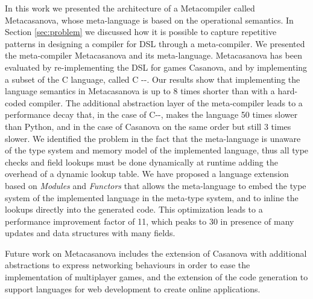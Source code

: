In this work we presented the architecture of a Metacompiler called Metacasanova, whose meta-language is based on the operational semantics. In Section \ref{sec:problem} we discussed how it is possible to capture repetitive patterns in designing a compiler for DSL through a meta-compiler. We presented the meta-compiler Metacasanova and its meta-language. Metacasanova has been evaluated by re-implementing the DSL for games Casanova, and by implementing a subset of the C language, called C -{}-. Our results show that implementing the language semantics in Metacasanova is up to 8 times shorter than with a hard-coded compiler. The additional abstraction layer of the meta-compiler leads to a performance decay that, in the case of C-{}-, makes the language 50 times slower than Python, and in the case of Casanova on the same order but still 3 times slower. We identified the problem in the fact that the meta-language is unaware of the type system and memory model of the implemented language, thus all type checks and field lookups must be done dynamically at runtime adding the overhead of a dynamic lookup table. We have proposed a language extension based on \textit{Modules} and \textit{Functors} that allows the meta-language to embed the type system of the implemented language in the meta-type system, and to inline the lookups directly into the generated code. This optimization leads to a performance improvement factor of 11, which peaks to 30 in presence of many updates and data structures with many fields. 

Future work on Metacasanova includes the extension of Casanova with additional abstractions to express networking behaviours in order to ease the implementation of multiplayer games, and the extension of the code generation to support languages for web development to create online applications.